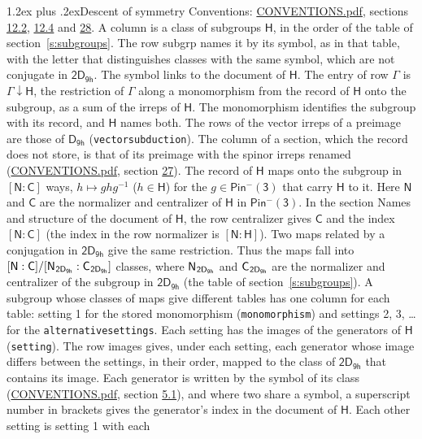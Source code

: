 \documentclass[10pt,a4paper]{article}
\makeatletter
\renewcommand\section{\@startsection{section}{1}{\z@}{-3ex plus -1ex minus -.2ex}%
  {1.2ex plus .2ex}{\normalfont\large\sffamily\bfseries\color{parttitle}}}
\numberwithin{equation}{section}
\newcommand{\grp}[1]{\mathsf{#1}}
\newcommand{\grpindex}[2]{[#1 : #2]}
\newcommand{\restr}[2]{#1\!\downarrow#2}
\newcommand{\hairsp}{\mkern1mu}
\makeatother
\begin{document}
\section{Descent of symmetry}\label{s:subduction}
Conventions: \href{../../CONVENTIONS.pdf}{CONVENTIONS.pdf}, sections \href{../../../rotation/CONVENTIONS.pdf\#conv.12.2}{12.2}, \href{../../../rotation/CONVENTIONS.pdf\#conv.12.4}{12.4} and \href{../../CONVENTIONS.pdf\#conv.28}{28}.
A column is a class of subgroups $\grp{H}$, in the order of the table of section~\ref{s:subgroups}. The row subgrp names it by its symbol, as in that table, with the letter that distinguishes classes with the same symbol, which are not conjugate in $\grp{2D_{9h}}$. The symbol links to the document of $\grp{H}$. The entry of row $\Gamma$ is $\restr{\Gamma}{\grp{H}}$, the restriction of $\Gamma$ along a monomorphism from the record of $\grp{H}$ onto the subgroup, as a sum of the irreps of $\grp{H}$. The monomorphism identifies the subgroup with its record, and $\grp{H}$ names both. The rows of the vector irreps of a preimage are those of \href{../../../rotation/data/pdf/D9h.pdf}{$\grp{D_{9h}}$} (\texttt{vectorsubduction}). The column of a section, which the record does not store, is that of its preimage with the spinor irreps renamed (\href{../../CONVENTIONS.pdf}{CONVENTIONS.pdf}, section \href{../../CONVENTIONS.pdf\#conv.27}{27}). \label{n:group.normalizer.o3}\label{n:group.centralizer.o3}\label{n:element.h}The record of $\grp{H}$ maps onto the subgroup in $\grpindex{\grp{N}}{\grp{C}}$ ways, $h \mapsto g h g^{-1}$ ($h \in \grp{H}$) for the $g \in \grp{Pin^{-}(3)}$ that carry $\grp{H}$ to it. Here $\grp{N}$ and $\grp{C}$ are the normalizer and centralizer of $\grp{H}$ in \href{Pinminus3.pdf}{$\grp{Pin^{-}(3)}$}. In the section Names and structure of the document of $\grp{H}$, the row centralizer gives $\grp{C}$ and the index $\grpindex{\grp{N}}{\grp{C}}$ (the index in the row normalizer is $\grpindex{\grp{N}}{\grp{H}}$). Two maps related by a conjugation in $\grp{2D_{9h}}$ give the same restriction. Thus the maps fall into $\grpindex{\grp{N}}{\grp{C}}/\grpindex{\grp{N}_{\hairsp \grp{2D_{9h}}}}{\grp{C}_{\hairsp \grp{2D_{9h}}}}$ classes, where $\grp{N}_{\hairsp \grp{2D_{9h}}}$ and $\grp{C}_{\hairsp \grp{2D_{9h}}}$ are the normalizer and centralizer of the subgroup in $\grp{2D_{9h}}$ (the table of section~\ref{s:subgroups}). \label{n:head.setting}A subgroup whose classes of maps give different tables has one column for each table: setting 1 for the stored monomorphism (\texttt{monomorphism}) and settings 2, 3, \dots{} for the \texttt{alternativesettings}. Each setting has the images of the generators of $\grp{H}$ (\texttt{setting}). \label{n:head.images}The row images gives, under each setting, each generator whose image differs between the settings, in their order, mapped to the class of $\grp{2D_{9h}}$ that contains its image. Each generator is written by the symbol of its class (\href{../../CONVENTIONS.pdf}{CONVENTIONS.pdf}, section \href{../../../rotation/CONVENTIONS.pdf\#conv.5.1}{5.1}), and where two share a symbol, a superscript number in brackets gives the generator's index in the document of $\grp{H}$. \label{n:irrep.Delta}Each other setting is setting 1 with each 
\end{document}
